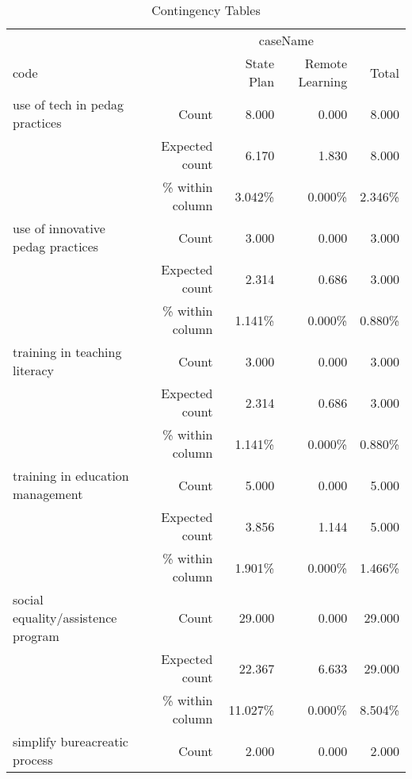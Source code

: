 \documentclass[6pt, oneside]{article}   	%
\begin{document}


\begin{table}[h]
	\centering
	\caption{Contingency Tables}
	\label{tab:contingencyTables}
	{
		\begin{tabular}{lrrrr}
			\toprule
			\multicolumn{1}{c}{} & \multicolumn{1}{c}{} & \multicolumn{2}{c}{caseName} & \multicolumn{1}{c}{} \\
			\cline{3-4}
			code &  & State Plan & Remote Learning & Total  \\
			\cmidrule[0.4pt]{1-5}
			use of tech in pedag practices & Count & 8.000 & 0.000 & 8.000  \\
			 & Expected count & 6.170 & 1.830 & 8.000  \\
			 &  \% within column & 3.042\% & 0.000\% & 2.346\%  \\
			use of innovative pedag practices & Count & 3.000 & 0.000 & 3.000  \\
			 & Expected count & 2.314 & 0.686 & 3.000  \\
			 &  \% within column & 1.141\% & 0.000\% & 0.880\%  \\
			training in teaching literacy & Count & 3.000 & 0.000 & 3.000  \\
			 & Expected count & 2.314 & 0.686 & 3.000  \\
			 &  \% within column & 1.141\% & 0.000\% & 0.880\%  \\
			training in education management & Count & 5.000 & 0.000 & 5.000  \\
			 & Expected count & 3.856 & 1.144 & 5.000  \\
			 &  \% within column & 1.901\% & 0.000\% & 1.466\%  \\
			social equality/assistence program & Count & 29.000 & 0.000 & 29.000  \\
			 & Expected count & 22.367 & 6.633 & 29.000  \\
			 &  \% within column & 11.027\% & 0.000\% & 8.504\%  \\
			simplify bureacreatic process & Count & 2.000 & 0.000 & 2.000  \\

\end{tabular}}
\end{table}
\end{document}
